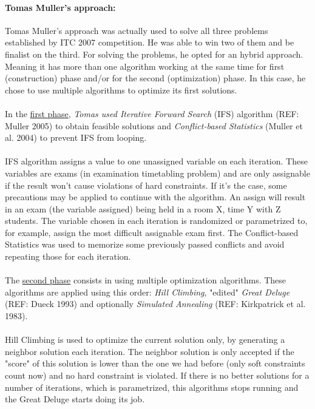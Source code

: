 \paragraph{\textbf{Tomas Muller's approach:}}

Tomas Muller's approach was actually used to solve all three problems established by ITC 2007 competition. He was able to win two of them and be finalist on the third. For solving the problems, he opted for an hybrid approach. Meaning it has more than one algorithm working at the same time for first (construction) phase and/or for the second (optimization) phase. In this case, he chose to use multiple algorithms to optimize its first solutions.\\
\\
In the \underline{first phase}, \textit{Tomas used Iterative Forward Search} (IFS) algorithm (REF: Muller 2005) to obtain feasible solutions and \textit{Conflict-based Statistics} (Muller et al. 2004) to prevent IFS from looping. \\
\\
IFS algorithm assigns a value to one unassigned variable on each iteration. These variables are exams (in examination timetabling problem) and are only assignable if the result won't cause violations of hard constraints. If it's the case, some precautions may be applied to continue with the algorithm. An assign will result in an exam (the variable assigned) being held in a room X, time Y with Z students. The variable chosen in each iteration is randomized or parametrized to, for example, assign the most difficult assignable exam first. The Conflict-based Statistics was used to memorize some previously passed conflicts and avoid repeating those for each iteration.\\
\\
The \underline{second phase} consists in using multiple optimization algorithms. These algorithms are applied using this order: \textit{Hill Climbing}, "edited" \textit{Great Deluge} (REF: Dueck 1993) and optionally \textit{Simulated Annealing} (REF: Kirkpatrick et al. 1983).\\
\\
Hill Climbing is used to optimize the current solution only, by generating a neighbor solution each iteration. The neighbor solution is only accepted if the "score" of this solution is lower than the one we had before (only soft constraints count now) and no hard constraint is violated. If there is no better solutions for a number of iterations, which is parametrized, this algorithms stops running and the Great Deluge starts doing its job.  \\
